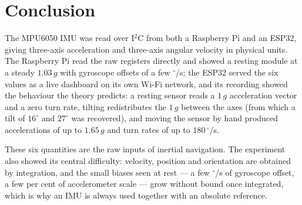 \documentclass[10pt,a4paper]{article}
\begin{document}
\section{Conclusion}

The MPU6050 IMU was read over I$^2$C from both a Raspberry Pi and an ESP32, giving
three-axis acceleration and three-axis angular velocity in physical units. The Raspberry Pi
read the raw registers directly and showed a resting module at a steady $1.03\,g$ with
gyroscope offsets of a few $^{\circ}$/s; the ESP32 served the six values as a live
dashboard on its own Wi-Fi network, and its recording showed the behaviour the theory
predicts: a resting sensor reads a $1\,g$ acceleration
vector and a zero turn rate, tilting redistributes the $1\,g$ between the axes (from
which a tilt of $16^{\circ}$ and $27^{\circ}$ was recovered), and moving the sensor by hand
produced accelerations of up to $1.65\,g$ and turn rates of up to $180\,^{\circ}$/s.

These six quantities are the raw inputs of inertial navigation. The experiment also
showed its central difficulty: velocity, position and orientation are obtained by
integration, and the small biases seen at rest --- a few $^{\circ}$/s of gyroscope offset,
a few per cent of accelerometer scale --- grow without bound once integrated, which is
why an IMU is always used together with an absolute reference.
\end{document}
